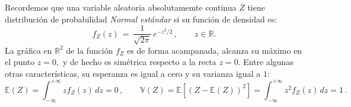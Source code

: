 \documentclass[spanish,10pt,letterpaper]{article}
\newcommand{\esper}{\mathbb{E}}
\newcommand{\vari}{\mathbb{V}}
\newcommand{\Runo}{\mathbb{R}}
\begin{document}
Recordemos que una variable aleatoria absolutamemte continua $Z$ tiene distribución de probabilidad \textit{Normal estándar} si su función de densidad es:
\begin{equation}\label{eq:fdpNormalStd}
    f_Z(z) \,=\, \frac{1}{\sqrt{2\pi}}\,e^{-z^2/2}\,,\qquad z\in\Runo.
\end{equation}
La gráfica en $\Runo^2$ de la función $f_Z$ es de forma acampanada, alcanza su máximo en el punto $z=0,$ y de hecho es simétrica respecto a la recta $z=0.$ Entre algunas otras características, su esperanza es igual a cero y su varianza igual a $1:$
\begin{equation*}
    \esper(Z)=\int_{-\infty}^{+\infty}zf_Z(z)\,dz = 0\,,\qquad \vari(Z) = \esper[(Z-\esper(Z))^2] = \int_{-\infty}^{+\infty}z^2f_Z(z)\,dz = 1\,.
\end{equation*}
\end{document}
